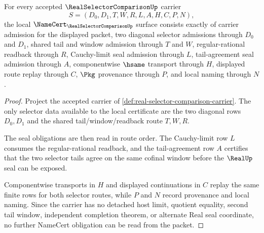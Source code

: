\begin{theorem}
\label{thm:real-selector-comparison-namecert-obligations}
For every accepted $\RealSelectorComparisonUp$ carrier
$$
S=(D_0,D_1,T,W,R,L,A,H,C,P,N),
$$
the local $\NameCert_{\RealSelectorComparisonUp}$ surface consists exactly of carrier admission for the displayed packet, two diagonal selector admissions through $D_0$ and $D_1$, shared tail and window admission through $T$ and $W$, regular-rational readback through $R$, Cauchy-limit seal admission through $L$, tail-agreement seal admission through $A$, componentwise $\hsame$ transport through $H$, displayed route replay through $C$, $\Pkg$ provenance through $P$, and local naming through $N$.
\end{theorem}
\begin{proof}
Project the accepted carrier of \autoref{def:real-selector-comparison-carrier}. The only selector data available to the local certificate are the two diagonal rows $D_0,D_1$ and the shared tail/window/readback route $T,W,R$.

The seal obligations are then read in route order. The Cauchy-limit row $L$ consumes the regular-rational readback, and the tail-agreement row $A$ certifies that the two selector tails agree on the same cofinal window before the $\RealUp$ seal can be exposed.

Componentwise transports in $H$ and displayed continuations in $C$ replay the same finite rows for both selector routes, while $P$ and $N$ record provenance and local naming. Since the carrier has no detached host limit, quotient equality, second tail window, independent completion theorem, or alternate Real seal coordinate, no further NameCert obligation can be read from the packet.
\end{proof}

